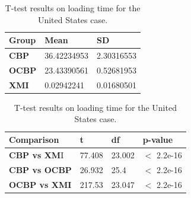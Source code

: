 \documentclass{llncs}
\begin{document}
    
    \begin{table}[ht]
        \centering
        \label{table:ttest_load_time_wikipedia}
        \caption{T-test results on loading time for the United States case.}
        \begin{minipage}{0.44\textwidth}
            \centering
            \begin{tabular}{|p{}|p{}|p{}|}
                \hline 
                \textbf{Group}  & \textbf{Mean} & \textbf{SD} \\ 
                \hline 
                \textbf{CBP} & 36.42234953     & 2.30316553 \\ 
                \hline 
                \textbf{OCBP} & 23.43390561  &  0.52681953 \\ 
                \hline 
                \textbf{XMI} &  0.02942241  & 0.01680501 \\ 
                \hline 
            \end{tabular} 
        \end{minipage}
        \hfill
        \begin{minipage}{0.54\textwidth}
            \centering
            \begin{tabular}{|p{}|p{}|p{}|p{}|}
                \hline 
                \textbf{Comparison} & \textbf{t}  & \textbf{df} & \textbf{p-value} \\ 
                \hline 
                \textbf{CBP vs XM}I &77.408   &23.002 & $<$ 2.2e-16 \\ 
                \hline 
                \textbf{CBP vs OCBP} &  26.932 & 25.4 & $<$ 2.2e-16 \\ 
                \hline 
                \textbf{OCBP vs XMI} & 217.53   & 23.047 & $<$ 2.2e-16 \\ 
                \hline 
            \end{tabular} 
        \end{minipage}
    \end{table}
    
\end{document}
